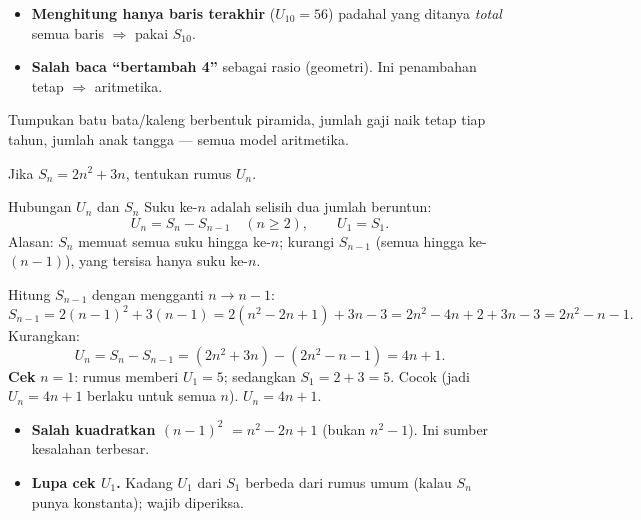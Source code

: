 \begin{jebakan}
\begin{itemize}[leftmargin=*,topsep=2pt]
  \item \textbf{Menghitung hanya baris terakhir} ($U_{10}=56$) padahal yang
  ditanya \emph{total} semua baris $\Rightarrow$ pakai $S_{10}$.
  \item \textbf{Salah baca ``bertambah 4''} sebagai rasio (geometri). Ini
  penambahan tetap $\Rightarrow$ aritmetika.
\end{itemize}
\end{jebakan}

\begin{variasi}
Tumpukan batu bata/kaleng berbentuk piramida, jumlah gaji naik tetap tiap tahun,
jumlah anak tangga --- semua model aritmetika.
\end{variasi}

\begin{soalbox}{}
Jika $S_n = 2n^2 + 3n$, tentukan rumus $U_n$.
\end{soalbox}

\begin{ingat}{Hubungan $U_n$ dan $S_n$}
Suku ke-$n$ adalah selisih dua jumlah beruntun:
\[
U_n = S_n - S_{n-1}\quad (n\ge2), \qquad U_1 = S_1.
\]
Alasan: $S_n$ memuat semua suku hingga ke-$n$; kurangi $S_{n-1}$ (semua hingga
ke-$(n-1)$), yang tersisa hanya suku ke-$n$.
\end{ingat}

\jawab
{} Hitung $S_{n-1}$ dengan mengganti $n\to n-1$:
\[
S_{n-1}=2(n-1)^2+3(n-1)=2(n^2-2n+1)+3n-3=2n^2-4n+2+3n-3=2n^2-n-1.
\]
 Kurangkan:
\[
U_n=S_n-S_{n-1}=(2n^2+3n)-(2n^2-n-1)=4n+1.
\]
 \textbf{Cek} $n=1$: rumus memberi $U_1=5$; sedangkan $S_1=2+3=5$.
Cocok \checkmark (jadi $U_n=4n+1$ berlaku untuk semua $n$).
\jadi $U_n=4n+1$.

\begin{jebakan}
\begin{itemize}[leftmargin=*,topsep=2pt]
  \item \textbf{Salah kuadratkan $(n-1)^2$} $=n^2-2n+1$ (bukan $n^2-1$). Ini
  sumber kesalahan terbesar.
  \item \textbf{Lupa cek $U_1$.} Kadang $U_1$ dari $S_1$ berbeda dari rumus umum
  (kalau $S_n$ punya konstanta); wajib diperiksa.
\end{itemize}
\end{jebakan}

